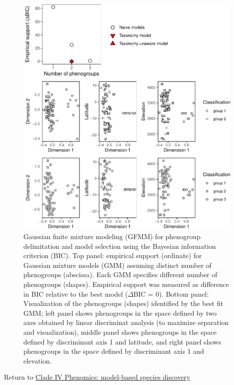 \documentclass[
  11pt,
]{article}
\begin{document}
\begin{figure}
\includegraphics{Supplementary_Material_files/figure-latex/cladeIVmorphologicalDelimitationPlots-1} \caption{Gaussian finite mixture modeling (GFMM) for phenogroup delimitation and model selection using the Bayesian information criterion (BIC). Top panel: empirical support (ordinate) for Gaussian mixture models (GMM) assuming distinct number of phenogroups (abscissa). Each GMM specifies different number of phenogroups (shapes). Empirical support was measured as difference in BIC relative to the best model ($\Delta$BIC = $0$). Bottom panel: Visualization of the phenogroups (shapes) identified by the best fit GMM; left panel shows phenogroups in the space defined by two axes obtained by linear discriminat analysis (to maximize separation and visualization), middle panel shows phenogroups in the space defined by discriminant axis 1 and latitude, and right panel shows phenogroups in the space defined by discriminant axis 1 and elevation.}\label{fig:cladeIVmorphologicalDelimitationPlots}
\end{figure}

Return to \protect\hyperlink{model-based-species-discovery-6}{Clade IV Phenomics: model-based species discovery}
\pagebreak
\end{document}

